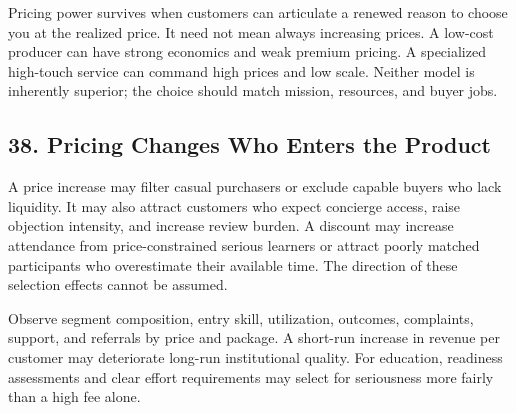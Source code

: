 Pricing power survives when customers can articulate a renewed reason to choose you at the realized price. It need not mean always increasing prices. A low-cost producer can have strong economics and weak premium pricing. A specialized high-touch service can command high prices and low scale. Neither model is inherently superior; the choice should match mission, resources, and buyer jobs.

\subsection*{38. Pricing Changes Who Enters the Product}

A price increase may filter casual purchasers or exclude capable buyers who lack liquidity. It may also attract customers who expect concierge access, raise objection intensity, and increase review burden. A discount may increase attendance from price-constrained serious learners or attract poorly matched participants who overestimate their available time. The direction of these selection effects cannot be assumed.

Observe segment composition, entry skill, utilization, outcomes, complaints, support, and referrals by price and package. A short-run increase in revenue per customer may deteriorate long-run institutional quality. For education, readiness assessments and clear effort requirements may select for seriousness more fairly than a high fee alone.
